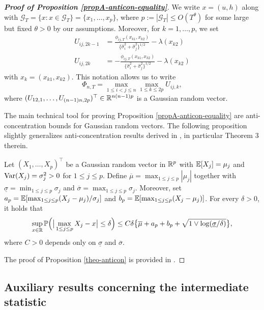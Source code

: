 \documentclass[a4paper,12pt]{article}
\begin{document}
\begin{proof}[\textnormal{\textbf{Proof of Proposition \ref{propA-anticon-equality}}}] 

We write $x = (u,h)$ along with $\mathcal{G}_T = \{ x : x \in \mathcal{G}_T \} = \{x_1,\ldots,x_p\}$, where $p := |\mathcal{G}_T| \le O(T^\theta)$ for some large but fixed $\theta > 0$ by our assumptions. Moreover, for $k = 1,\ldots,p$, we set 
\begin{align*}
U_{ij, 2k-1} & = \frac{\phi_{ij, T}(x_{k1},x_{k2})}{\{\widehat{\sigma}_i^2 + \widehat{\sigma}_j^2\}^{1/2}} - \lambda(x_{k2}) \\
U_{ij, 2k} & = -\frac{\phi_{ij, T}(x_{k1},x_{k2})}{\{\widehat{\sigma}_i^2 + \widehat{\sigma}_j^2\}^{1/2}} - \lambda(x_{k2}) 
\end{align*}
with $x_k = (x_{k1},x_{k2})$. This notation allows us to write
\[ \Phi_{n, T} = \max_{1\le i < j \le n} \max_{1 \le k \le 2p} U_{ij, k}, \]
where $(U_{12, 1},\ldots,U_{(n-1)n, 2p})^\top \in \mathbb{R}^{n(n-1)p}$ is a Gaussian random vector.

The main technical tool for proving Proposition \ref{propA-anticon-equality} are anti-concentration bounds for Gaussian random vectors. The following proposition slightly generalizes anti-concentration results derived in \cite{Chernozhukov2015}, in particular Theorem 3 therein.

\begin{propA}\label{theo-anticon}
Let $(X_1,\ldots,X_p)^\top$ be a Gaussian random vector in $\mathbb{R}^p$ with $\mathbb{E}[X_j] = \mu_j$ and $\textnormal{Var}(X_j) = \sigma_j^2 > 0$ for $1 \le j \le p$. Define $\overline{\mu} = \max_{1 \le j \le p} |\mu_j|$ together with $\underline{\sigma} = \min_{1 \le j \le p} \sigma_j$ and $\overline{\sigma} = \max_{1 \le j \le p} \sigma_j$. Moreover, set $a_p = \mathbb{E}[ \max_{1 \le j \le p} (X_j-\mu_j)/\sigma_j ]$ and $b_p = \mathbb{E}[ \max_{1 \le j \le p} (X_j-\mu_j) ]$. For every $\delta > 0$, it holds that
\[ \sup_{x \in \mathbb{R}} \mathbb{P} \Big( \big| \max_{1 \le j \le p} X_j - x \big| \le \delta \Big) \le C \delta \big\{ \overline{\mu} + a_p + b_p + \sqrt{1 \vee \log(\underline{\sigma}/\delta)} \big\}, \]
where $C > 0$ depends only on $\underline{\sigma}$ and $\overline{\sigma}$. 
\end{propA} 
The proof of Proposition \ref{theo-anticon} is provided in \cite{KhismatullinaVogt2018}.
\end{proof}

\subsection*{Auxiliary results concerning the intermediate statistic}
\end{document}
